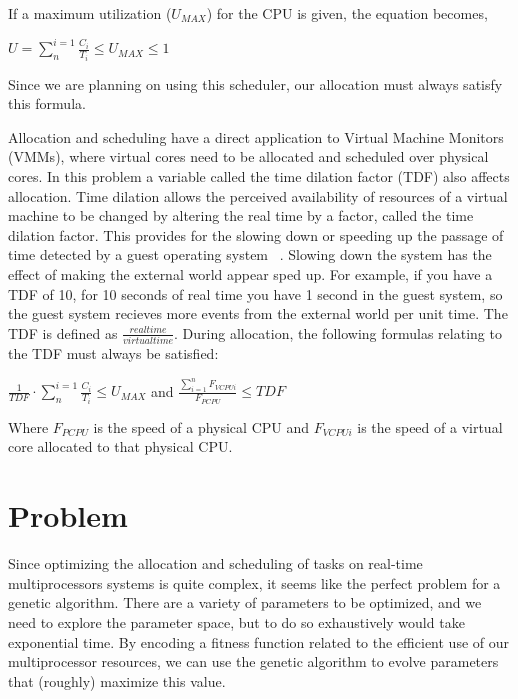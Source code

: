 \documentclass[11pt]{article}
\begin{document}
If a maximum utilization ($U_{MAX}$) for the CPU is given, the equation becomes,

\begin{center}
$U = \sum_{n}^{i=1} \frac{C_{i}}{T_{i}} \leq U_{MAX} \leq 1$ 
\end{center}

Since we are planning on using this scheduler, our allocation must always satisfy this formula.

Allocation and scheduling have a direct application to Virtual Machine Monitors (VMMs), where virtual cores need to be allocated and scheduled over physical cores. In this problem a variable called the time dilation factor (TDF) also affects allocation. Time dilation allows the perceived availability of resources of a virtual machine to be changed by altering the real time by a factor, called the time dilation factor. This provides for the slowing down or speeding up the passage of time detected by a guest operating system ~\cite{Gupta:06}. Slowing down the system has the effect of making the external world appear sped up. For example, if you have a TDF of 10, for 10 seconds of real time you have 1 second in the guest system, so the guest system recieves more events from the external world per unit time. The TDF is defined as $\frac{real time}{virtual time}$. During allocation, the following formulas relating to the TDF must always be satisfied:

\begin{center}
$ \frac{1}{TDF} \cdot \sum_{n}^{i=1} \frac{C_{i}}{T_{i}} \leq U_{MAX}$ and
$\frac{\sum_{i=1}^{n} F_{VCPUi} }{F_{PCPU}} \leq TDF$
\end{center}

Where $F_{PCPU}$ is the speed of a physical CPU and $F_{VCPUi}$ is the speed of a virtual core allocated to that physical CPU.


\section{Problem}

Since optimizing the allocation and scheduling of tasks on real-time multiprocessors systems is quite complex, it seems like the perfect problem for a genetic algorithm. There are a variety of parameters to be optimized, and we need to explore the parameter space, but to do so exhaustively would take exponential time. By encoding a fitness function related to the efficient use of our multiprocessor resources, we can use the genetic algorithm to evolve parameters that (roughly) maximize this value.
\end{document}
